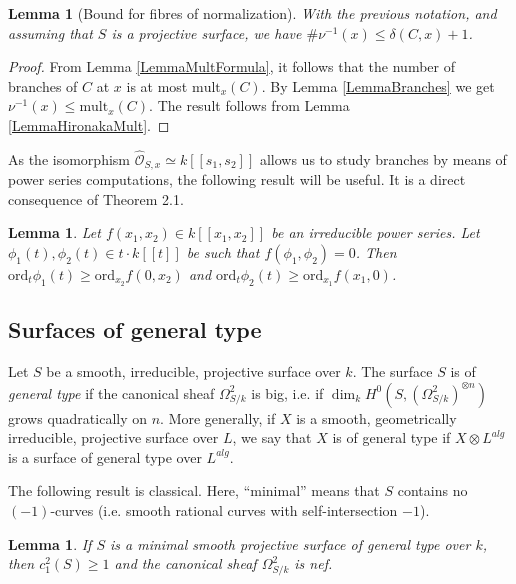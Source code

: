 \documentclass[11pt]{amsart}
\newtheorem{lemma}[theorem]{Lemma}
\theoremstyle{remark}
\numberwithin{equation}{section}
\newcommand{\Ocal}{\mathscr{O}}
\newcommand{\ord}{\mathrm{ord}}
\newcommand{\mult}{\mathrm{mult}}
\begin{document}
\begin{lemma}[Bound for fibres of normalization] \label{LemmaBounddelta} With the previous notation, and assuming that $S$ is a projective surface, we have $\#\nu^{-1}(x)\le \delta(C,x)+1$.
\end{lemma}
\begin{proof} From Lemma \ref{LemmaMultFormula}, it follows that the number of branches of $C$ at $x$ is at most $\mult_x(C)$. By Lemma \ref{LemmaBranches} we get $\nu^{-1}(x)\le \mult_x(C)$. The result follows from Lemma \ref{LemmaHironakaMult}.
\end{proof}


As the isomorphism $\widehat{\Ocal}_{S,x}\simeq  k[[s_1,s_2]]$ allows us to study branches by means of power series computations, the following result will be useful. It is a direct consequence of \cite{Ploski} Theorem 2.1.
\begin{lemma} \label{LemmaPloski} Let $f(x_1,x_2)\in k[[x_1,x_2]]$ be an irreducible power series. Let $\phi_1(t),\phi_2(t)\in t\cdot k[[t]]$ be such that $f(\phi_1,\phi_2)=0$. Then $\ord_t\phi_1(t)\ge \ord_{x_2} f(0,x_2)$ and $\ord_t\phi_2(t)\ge \ord_{x_1} f(x_1,0)$.
\end{lemma}




\subsection{Surfaces of general type} Let $S$ be a smooth, irreducible, projective surface over $k$.  The surface $S$ is of \emph{general type} if the canonical sheaf $\Omega^2_{S/k}$ is big, i.e. if $\dim_kH^0(S,(\Omega^2_{S/k})^{\otimes n})$ grows quadratically on $n$. More generally, if $X$ is a smooth, geometrically irreducible, projective surface over $L$, we say that $X$ is of general type if $X\otimes L^{alg}$ is a surface of general type over $L^{alg}$.

The following result is classical. Here, ``minimal'' means that $S$ contains no $(-1)$-curves (i.e. smooth rational curves with self-intersection $-1$).

\begin{lemma} \label{LemmaNef} If $S$ is a minimal smooth projective surface of general type over $k$, then $c_1^2(S)\ge 1$ and the canonical sheaf $\Omega^2_{S/k}$ is nef. 
\end{lemma}
\end{document}

